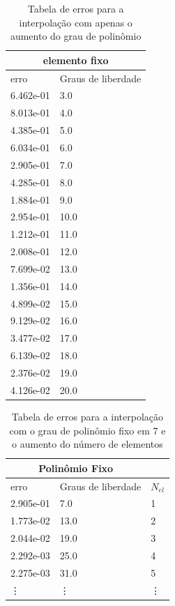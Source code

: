 \begin{table}[]
\centering
\caption{Tabela de erros para a interpolação com apenas o aumento do grau de polinômio}

\label{my-label}
\begin{tabular}{|l|l|}
\hline
\multicolumn{2}{|c|}{elemento fixo} \\
\hline
erro        & Graus de liberdade   \\
6.462e-01   & 3.0                  \\
8.013e-01   & 4.0                  \\
4.385e-01   & 5.0                  \\
6.034e-01   & 6.0                  \\
2.905e-01   & 7.0                  \\
4.285e-01   & 8.0                  \\
1.884e-01   & 9.0                  \\
2.954e-01   & 10.0                 \\
1.212e-01   & 11.0                 \\
2.008e-01   & 12.0                 \\
7.699e-02   & 13.0                 \\
1.356e-01   & 14.0                 \\
4.899e-02   & 15.0                 \\
9.129e-02   & 16.0                 \\
3.477e-02   & 17.0                 \\
6.139e-02   & 18.0                 \\
2.376e-02   & 19.0                 \\
4.126e-02   & 20.0                \\
\hline
\end{tabular}
\end{table}

\begin{table}[]
\centering
\caption{Tabela de erros para a interpolação com o grau de polinômio fixo em 7 e o aumento do número de elementos}
\label{my-label}
\begin{tabular}{|l|l|l|}
\hline
\multicolumn{2}{|c|}{Polinômio Fixo} &           \\
\hline
erro         & Graus de liberdade    & $N_{el}$ \\
2.905e-01    & 7.0                 & 1         \\
1.773e-02    & 13.0                & 2         \\
2.044e-02    & 19.0                & 3         \\
2.292e-03    & 25.0                & 4         \\
2.275e-03    & 31.0                & 5        \\
\vdots       &  \vdots             & \vdots   \\
\hline
\end{tabular}
\end{table}

